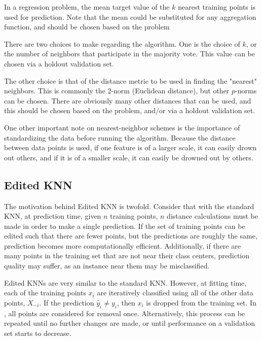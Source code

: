 \documentclass{amsart}
\begin{document}
    In a regression problem, the mean target value of the $k$ nearest training points is used for
    prediction. Note that the mean could be substituted for any aggregation function,
    and should be chosen based on the problem

    There are two choices to make regarding the algorithm. One is the choice of $k$, or the number
    of neighbors that participate in the majority vote. This value can be chosen via
    a holdout validation set.

    The other choice is that of the distance metric to be used in
    finding the "nearest" neighbors. This is commonly the 2-norm (Euclidean distance), but
    other $p$-norms can be chosen. There are obviously many other distances that can be
    used, and this should be chosen based on the problem, and/or via a holdout validation set.

    One other important note on nearest-neighbor schemes is the importance of
    standardizing the data before running the algorithm. Because the distance between
    data points is used, if one feature is of a larger scale, it can easily drown out others, and
    if it is of a smaller scale, it can easily be drowned out by others.

    \subsection*{Edited KNN}
    The motivation behind Edited KNN is twofold. Consider that with the standard KNN, at
    prediction time, given $n$ training points, $n$ distance calculations must be made in order
    to make a single prediction. If the set of training points can be edited such that there are
    fewer points, but the predictions are roughly the same, prediction becomes more computationally
    efficient. Additionally, if there are many points in the training set that are not near their class
    centers, prediction quality may suffer, as an instance near them may be misclassified.

    Edited KNNs\cite{edited_knn} are very similar to the standard KNN. However, at fitting time, each of the
    training points $x_i$ are iteratively classified using all of the other data points, $X_{-i}$.
    If the prediction $\hat{y}_i \neq y_i$, then $x_i$ is dropped from the training set. In \cite{edited_knn},
    all points are considered for removal once. Alternatively, this process can be
    repeated until no further changes are made, or until performance on a validation set
    starts to decrease.
\end{document}
